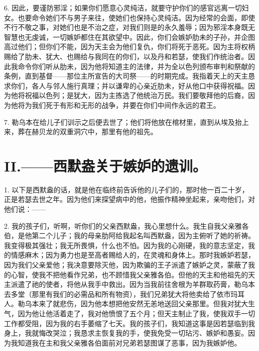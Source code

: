 6. 因此，要谨防邪淫；如果你们愿意心灵纯洁，就要守护你们的感官远离一切妇女。也要命令她们不与男子来往，使她们也保持心灵纯洁。因为经常的会面，即使不行不敬之事，对她们也是不治之症，对我们则是的永久羞辱；因为邪淫本身既无智慧也无虔诚，一切嫉妒都住在其欲望中。因此，你们会嫉妒肋未的子孙，并企图高过他们；但你们不能，因为天主会为他们复仇，你们将死于恶死。因为主将权柄赐给了肋未、犹大、也赐给与我同在的你们，以及丹和若瑟，使我们作统治者。因此我命令你们听从肋未，因为他将知道主的法律，并为全以色列颁布审判和祭献的条例，直到基督——那位主所宣告的大司祭——的时期完成。我指着天上的天主恳求你们，各人与邻人施行真理；并以谦卑的心亲近肋未，好从他口中获得祝福。因为他将祝福以色列；是犹大，因为主拣选了他统治万民。我们要敬拜他的后裔，因为他将为我们死于有形和无形的战争，并要在你们中间作永远的君王。\par

7. 勒乌本在给儿子们训示之后便去世了；他们将他放在棺材里，直到从埃及抬上来，葬在赫贝龙的双重洞穴中，那里有他的祖先。\par


\section{II.——西默盎关于嫉妒的遗训。}

1. 以下是西默盎的话，就是他在临终前告诉他的儿子们的，那时他一百二十岁，正是若瑟去世之年。因为他们来探望病中的他，他振作精神坐起来，亲吻他们，对他们说：——\par

2. 我的孩子们，听啊，听你们的父亲西默盎，我心里想什么。我生自我父亲雅各伯，是他第二个儿子；我的母亲肋阿给我起名叫西默盎，因为主俯听了她的祈祷。我变得极其强壮；我无所畏惧，什么也不怕。因为我的心刚硬，我的意志坚定，我的情感麻木；因为勇力也是至高者赐给人的，在灵魂和身体上。那时我嫉妒若瑟，因为我们父亲爱他；我决意要除灭他，因为欺骗的王子派遣了嫉妒之灵，蒙蔽了我的心智，使我不把他看作兄弟，也不顾惜我父亲雅各伯。但他的天主和他祖先的天主派遣了祂的使者，将他从我手中救出。因为当我前往舍根为羊群取药膏，勒乌本去多堂（那里有我们的必需品和所有物资），我们兄弟犹大将他卖给了依市玛耳人。勒乌本来了就悲伤，因为他本想把他安然无恙地送回父亲那里。但我对犹大生气，因为他让他活着走了，我对他愤恨了五个月；但天主制止了我，使我双手一切工作都受阻，因为我的右手萎缩了七天。我的孩子们，我知道这事是因若瑟临到我身上，我就悔改哭泣；我恳求主恢复我的手，使我免受一切玷污、嫉妒和愚妄。因为我知道我在主和我父亲雅各伯面前对兄弟若瑟图谋了恶事，因为我嫉妒他。\par

